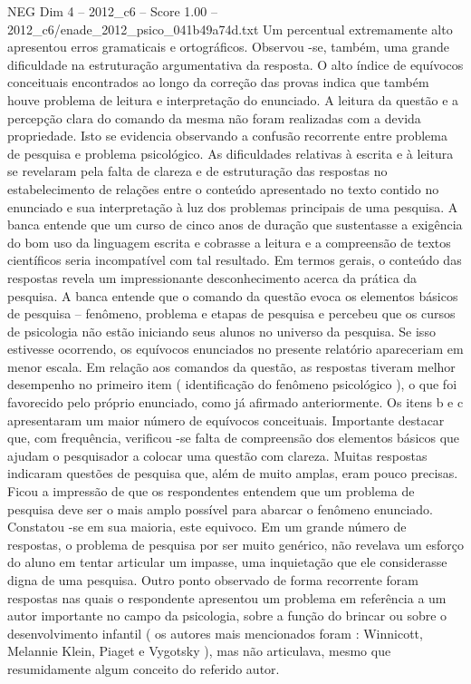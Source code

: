 \begin{textsample}{NEG Dim 4 – 2012\_c6 – Score 1.00 – 2012\_c6/enade\_2012\_psico\_041b49a74d.txt}
Um percentual extremamente alto apresentou erros gramaticais e ortográficos.
Observou -se, também, uma grande dificuldade na estruturação argumentativa da resposta.
O alto índice de equívocos conceituais encontrados ao longo da correção das provas indica que também houve problema de leitura e interpretação do enunciado.
A leitura da questão e a percepção clara do comando da mesma não foram realizadas com a devida propriedade.
Isto se evidencia observando a confusão recorrente entre problema de pesquisa e problema psicológico.
As dificuldades relativas à escrita e à leitura se revelaram pela falta de clareza e de estruturação das respostas no estabelecimento de relações entre o conteúdo apresentado no texto contido no enunciado e sua interpretação à luz dos problemas principais de uma pesquisa.
A banca entende que um curso de cinco anos de duração que sustentasse a exigência do bom uso da linguagem escrita e cobrasse a leitura e a compreensão de textos científicos seria incompatível com tal resultado.
Em termos gerais, o conteúdo das respostas revela um impressionante desconhecimento acerca da prática da pesquisa.
A banca entende que o comando da questão evoca os elementos básicos de pesquisa – fenômeno, problema e etapas de pesquisa e percebeu que os cursos de psicologia não estão iniciando seus alunos no universo da pesquisa.
Se isso estivesse ocorrendo, os equívocos enunciados no presente relatório apareceriam em menor escala.
Em relação aos comandos da questão, as respostas tiveram melhor desempenho no primeiro item ( identificação do fenômeno psicológico ), o que foi favorecido pelo próprio enunciado, como já afirmado anteriormente.
Os itens b e c apresentaram um maior número de equívocos conceituais.
Importante destacar que, com frequência, verificou -se falta de compreensão dos elementos básicos que ajudam o pesquisador a colocar uma questão com clareza.
Muitas respostas indicaram questões de pesquisa que, além de muito amplas, eram pouco precisas.
Ficou a impressão de que os respondentes entendem que um problema de pesquisa deve ser o mais amplo possível para abarcar o fenômeno enunciado.
Constatou -se em sua maioria, este equivoco.
Em um grande número de respostas, o problema de pesquisa por ser muito genérico, não revelava um esforço do aluno em tentar articular um impasse, uma inquietação que ele considerasse digna de uma pesquisa.
Outro ponto observado de forma recorrente foram respostas nas quais o respondente apresentou um problema em referência a um autor importante no campo da psicologia, sobre a função do brincar ou sobre o desenvolvimento infantil ( os autores mais mencionados foram : Winnicott, Melannie Klein, Piaget e Vygotsky ), mas não articulava, mesmo que resumidamente algum conceito do referido autor.

\end{textsample}
